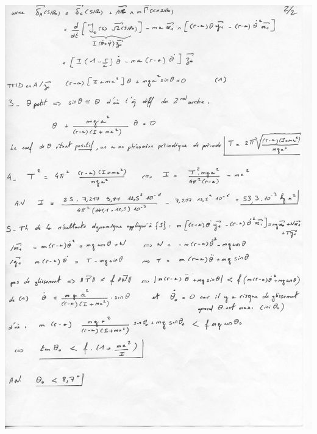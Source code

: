 \documentclass[10pt,fleqn]{article} %
\begin{document}
\begin{center}
\includegraphics[width=\linewidth]{images/cor_02}
\end{center}


\end{document}
